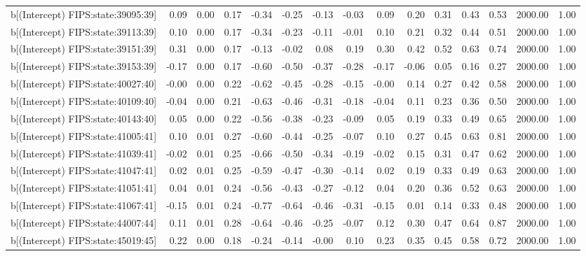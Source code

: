 \begin{table}[ht]
\begin{tabular}{rrrrrrrrrrrrrrr}
  b[(Intercept) FIPS:state:39095:39] & 0.09 & 0.00 & 0.17 & -0.34 & -0.25 & -0.13 & -0.03 & 0.09 & 0.20 & 0.31 & 0.43 & 0.53 & 2000.00 & 1.00 \\ 
  b[(Intercept) FIPS:state:39113:39] & 0.10 & 0.00 & 0.17 & -0.34 & -0.23 & -0.11 & -0.01 & 0.10 & 0.21 & 0.32 & 0.44 & 0.51 & 2000.00 & 1.00 \\ 
  b[(Intercept) FIPS:state:39151:39] & 0.31 & 0.00 & 0.17 & -0.13 & -0.02 & 0.08 & 0.19 & 0.30 & 0.42 & 0.52 & 0.63 & 0.74 & 2000.00 & 1.00 \\ 
  b[(Intercept) FIPS:state:39153:39] & -0.17 & 0.00 & 0.17 & -0.60 & -0.50 & -0.37 & -0.28 & -0.17 & -0.06 & 0.05 & 0.16 & 0.27 & 2000.00 & 1.00 \\ 
  b[(Intercept) FIPS:state:40027:40] & -0.00 & 0.00 & 0.22 & -0.62 & -0.45 & -0.28 & -0.15 & -0.00 & 0.14 & 0.27 & 0.42 & 0.58 & 2000.00 & 1.00 \\ 
  b[(Intercept) FIPS:state:40109:40] & -0.04 & 0.00 & 0.21 & -0.63 & -0.46 & -0.31 & -0.18 & -0.04 & 0.11 & 0.23 & 0.36 & 0.50 & 2000.00 & 1.00 \\ 
  b[(Intercept) FIPS:state:40143:40] & 0.05 & 0.00 & 0.22 & -0.56 & -0.38 & -0.23 & -0.09 & 0.05 & 0.19 & 0.33 & 0.49 & 0.65 & 2000.00 & 1.00 \\ 
  b[(Intercept) FIPS:state:41005:41] & 0.10 & 0.01 & 0.27 & -0.60 & -0.44 & -0.25 & -0.07 & 0.10 & 0.27 & 0.45 & 0.63 & 0.81 & 2000.00 & 1.00 \\ 
  b[(Intercept) FIPS:state:41039:41] & -0.02 & 0.01 & 0.25 & -0.66 & -0.50 & -0.34 & -0.19 & -0.02 & 0.15 & 0.31 & 0.47 & 0.62 & 2000.00 & 1.00 \\ 
  b[(Intercept) FIPS:state:41047:41] & 0.02 & 0.01 & 0.25 & -0.59 & -0.47 & -0.30 & -0.14 & 0.02 & 0.19 & 0.33 & 0.49 & 0.63 & 2000.00 & 1.00 \\ 
  b[(Intercept) FIPS:state:41051:41] & 0.04 & 0.01 & 0.24 & -0.56 & -0.43 & -0.27 & -0.12 & 0.04 & 0.20 & 0.36 & 0.52 & 0.63 & 2000.00 & 1.00 \\ 
  b[(Intercept) FIPS:state:41067:41] & -0.15 & 0.01 & 0.24 & -0.77 & -0.64 & -0.46 & -0.31 & -0.15 & 0.01 & 0.14 & 0.33 & 0.48 & 2000.00 & 1.00 \\ 
  b[(Intercept) FIPS:state:44007:44] & 0.11 & 0.01 & 0.28 & -0.64 & -0.46 & -0.25 & -0.07 & 0.12 & 0.30 & 0.47 & 0.64 & 0.87 & 2000.00 & 1.00 \\ 
  b[(Intercept) FIPS:state:45019:45] & 0.22 & 0.00 & 0.18 & -0.24 & -0.14 & -0.00 & 0.10 & 0.23 & 0.35 & 0.45 & 0.58 & 0.72 & 2000.00 & 1.00 \\ 

\end{tabular}
\end{table}
